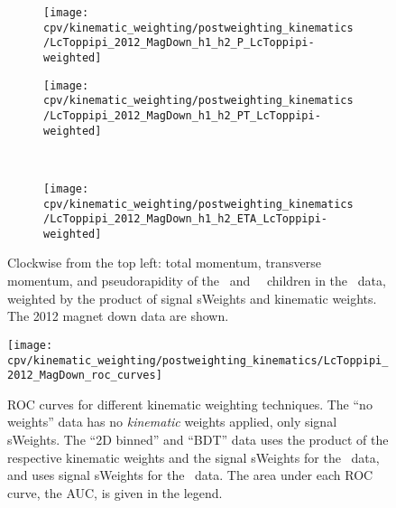 \begin{figure}
  \begin{subfigure}[b]{0.5\textwidth}
    \centering
    \texttt{[image: cpv/kinematic\_weighting/postweighting\_kinematics/LcToppipi\_2012\_MagDown\_h1\_h2\_P\_LcToppipi-weighted]}
    \label{fig:cpv:kinematic_weighting:post:ppipi_h1h2:P}
  \end{subfigure}
  \begin{subfigure}[b]{0.5\textwidth}
    \centering
    \texttt{[image: cpv/kinematic\_weighting/postweighting\_kinematics/LcToppipi\_2012\_MagDown\_h1\_h2\_PT\_LcToppipi-weighted]}
    \label{fig:cpv:kinematic_weighting:post:ppipi_h1h2:PT}
  \end{subfigure}\\
  \begin{subfigure}[b]{\textwidth}
    \centering
    \texttt{[image: cpv/kinematic\_weighting/postweighting\_kinematics/LcToppipi\_2012\_MagDown\_h1\_h2\_ETA\_LcToppipi-weighted]}
    \label{fig:cpv:kinematic_weighting:post:ppipi_h1h2:ETA}
  \end{subfigure}
  \caption{%
    Clockwise from the top left: total momentum, transverse momentum, and
    pseudorapidity of the \Ppiminus\ and \Ppiplus\ \PLambdac\ children in the
    \ppipi\ data, weighted by the product of signal sWeights and kinematic
    weights.
    The 2012 magnet down data are shown.
  }
  \label{fig:cpv:kinematic_weighting:post:ppipi_h1h2}
\end{figure}

\begin{figure}
  \texttt{[image: cpv/kinematic\_weighting/postweighting\_kinematics/LcToppipi\_2012\_MagDown\_roc\_curves]}
  \caption{%
    ROC curves for different kinematic weighting techniques.
    The ``no weights'' data has no \emph{kinematic} weights applied, only
    signal sWeights.
    The ``2D binned'' and ``\ac{BDT}'' data uses the product of the respective
    kinematic weights and the signal sWeights for the \ppipi\ data, and uses
    signal sWeights for the \pKK\ data.
    The area under each \ac{ROC} curve, the \acs{AUC}, is given in the legend.
  }
  \label{fig:cpv:kinematic_weighting:post:roc}
\end{figure}
